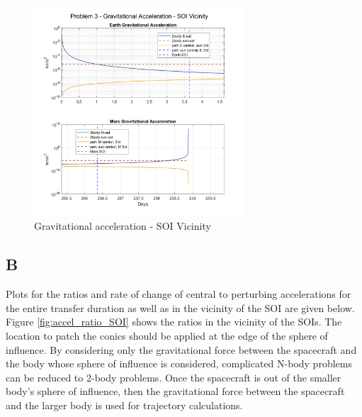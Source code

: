 \documentclass[conf]{new-aiaa}
\begin{document}
\begin{figure}[H]
    \centering 
    \includegraphics[width=0.7\textwidth]{Problem 3 - Gravitational Acceleration - SOI Vicinity.pdf}
    \caption{Gravitational acceleration - SOI Vicinity}
\end{figure}


\subsection*{B}

Plots for the ratios and rate of change of central to perturbing accelerations for the entire transfer duration as well as in the vicinity of the SOI are given below. \\ 

Figure \ref{fig:accel_ratio_SOI} shows the ratios in the vicinity of the SOIs. The location to patch the conics should be applied at the edge of the sphere of influence. By considering only the gravitational force between the spacecraft and the body whose sphere of influence is considered, complicated N-body problems can be reduced to 2-body problems. Once the spacecraft is out of the smaller body's sphere of influence, then the gravitational force between the spacecraft and the larger body is used for trajectory calculations. 
\end{document}
